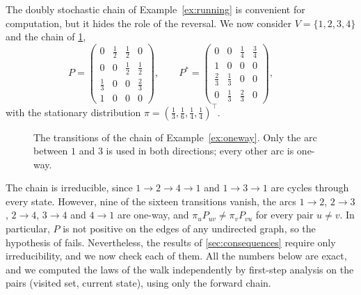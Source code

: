 \documentclass[onefignum,onetabnum]{siamart250211}
\numberwithin{theorem}{section}
\numberwithin{equation}{section}
\begin{document}
\begin{example}\label{ex:oneway}
The doubly stochastic chain of Example~\ref{ex:running} is convenient for
computation, but it hides the role of the reversal. We now consider $V=\{1,2,3,4\}$ and the chain of \cref{fig:sm-oneway},
\[
P=\begin{pmatrix}
0&\tfrac12&\tfrac12&0\\
0&0&\tfrac12&\tfrac12\\
\tfrac13&0&0&\tfrac23\\
1&0&0&0
\end{pmatrix},
\qquad
P^{*}=\begin{pmatrix}
0&0&\tfrac14&\tfrac34\\
1&0&0&0\\
\tfrac23&\tfrac13&0&0\\
0&\tfrac13&\tfrac23&0
\end{pmatrix},
\qquad
\]
with the stationary distribution
$\pi=(\tfrac13,\tfrac16,\tfrac14,\tfrac14)^{\top}$.


\begin{figure}[H]
\centering
{}
\caption{The transitions of the chain of Example~\ref{ex:oneway}. Only the
arc between $1$ and $3$ is used in both directions; every other arc is
one-way.}
\label{fig:sm-oneway}
\end{figure}

The chain is irreducible, since $1\to2\to4\to1$ and $1\to3\to1$ are
cycles through every state. However, nine of the sixteen transitions
vanish, the arcs $1\to2$, $2\to3$, $2\to4$, $3\to4$ and $4\to1$ are
one-way, and $\pi_uP_{uv}\ne\pi_vP_{vu}$ for every pair $u\ne v$. In
particular, $P$ is not positive on the edges of any undirected graph,
so the hypothesis of \cite{FredesMarckert2023} fails. Nevertheless,
the results of \cref{sec:consequences} require only irreducibility,
and we now check each of them. All the numbers below are exact, and we
computed the laws of the walk independently by first-step analysis on
the pairs (visited set, current state), using only the forward chain.


\end{example}
\end{document}
